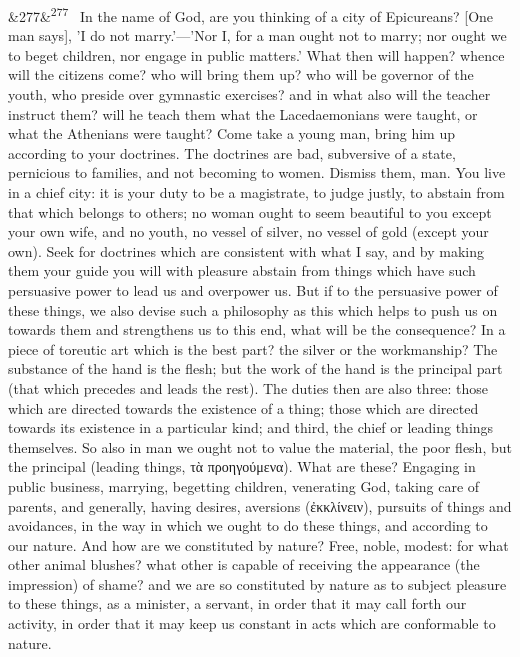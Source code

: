 \documentclass[12pt]{article}
\newcommand{\para}[1][]{\par\noindent\ifx&#1&\else\textsuperscript{\footnotesize #1}~\fi}
\begin{document}
\para[277] In the name of God, are you thinking of a city of Epicureans? [One man says], 'I do not marry.'—'Nor I, for a man ought not to marry; nor ought we to beget children, nor engage in public matters.' What then will happen? whence will the citizens come? who will bring them up? who will be governor of the youth, who preside over gymnastic exercises? and in what also will the teacher instruct them? will he teach them what the Lacedaemonians were taught, or what the Athenians were taught? Come take a young man, bring him up according to your doctrines. The doctrines are bad, subversive of a state, pernicious to families, and not becoming to women. Dismiss them, man. You live in a chief city: it is your duty to be a magistrate, to judge justly, to abstain from that which belongs to others; no woman ought to seem beautiful to you except your own wife, and no youth, no vessel of silver, no vessel of gold (except your own). Seek for doctrines which are consistent with what I say, and by making them your guide you will with pleasure abstain from things which have such persuasive power to lead us and overpower us. But if to the persuasive power of these things, we also devise such a philosophy as this which helps to push us on towards them and strengthens us to this end, what will be the consequence? In a piece of toreutic art which is the best part? the silver or the workmanship? The substance of the hand is the flesh; but the work of the hand is the principal part (that which precedes and leads the rest). The duties then are also three: those which are directed towards the existence of a thing; those which are directed towards its existence in a particular kind; and third, the chief or leading things themselves. So also in man we ought not to value the material, the poor flesh, but the principal (leading things, τὰ προηγούμενα). What are these? Engaging in public business, marrying, begetting children, venerating God, taking care of parents, and generally, having desires, aversions (ἐκκλίνειν), pursuits of things and avoidances, in the way in which we ought to do these things, and according to our nature. And how are we constituted by nature? Free, noble, modest: for what other animal blushes? what other is capable of receiving the appearance (the impression) of shame? and we are so constituted by nature as to subject pleasure to these things, as a minister, a servant, in order that it may call forth our activity, in order that it may keep us constant in acts which are conformable to nature.
\end{document}
